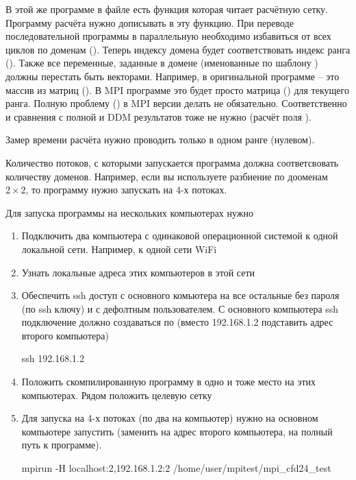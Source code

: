 В этой же программе в файле  есть функция 
которая читает расчётную сетку. Программу расчёта нужно дописывать в эту функцию.
При переводе последовательной программы в параллельную необходимо
избавиться от всех циклов по доменам (). Теперь индексу домена будет соответствовать индекс ранга ().
Также все переменные, заданные в домене (именованные по шаблону )
должны перестать быть векторами. Например,  в оригинальной программе -- это массив из матриц ().
В MPI программе это будет просто матрица () для текущего ранга.
Полную проблему () в MPI версии делать не обязательно.
Соответственно и сравнения с полной и DDM результатов тоже не нужно (расчёт поля ).

Замер времени расчёта нужно проводить только в одном ранге (нулевом).

Количество потоков, с которыми запускается программа должна соответсвовать количеству доменов.
Например, если вы используете разбиение по дооменам $2\times2$, то программу нужно запускать на 4-х потоках.

Для запуска программы на нескольких компьютерах нужно
\begin{enumerate}
\item Подключить два компьютера с одинаковой операционной системой к одной локальной сети. Например, к одной сети WiFi
\item Узнать локальные адреса этих компьютеров в этой сети
\item Обеспечить ssh доступ с основного комьютера на все остальные без пароля (по ssh ключу) и с дефолтным пользователем.
      С основного компьютера ssh подключение должно создаваться по (вместо 192.168.1.2 подставить адрес второго компьютера)
\begin{bashcode}
ssh 192.168.1.2
\end{bashcode}

\item Положить скомпилированную программу  в одно и тоже место на этих компьютерах. Рядом положить целевую сетку
\item Для запуска на 4-х потоках (по два на компьютер) нужно на основном компьютере запустить (заменить  на адрес второго компьютера,  на полный путь к программе).
\begin{bashcode}
mpirun -H localhost:2,192.168.1.2:2 /home/user/mpitest/mpi_cfd24_test
\end{bashcode}
\end{enumerate}
